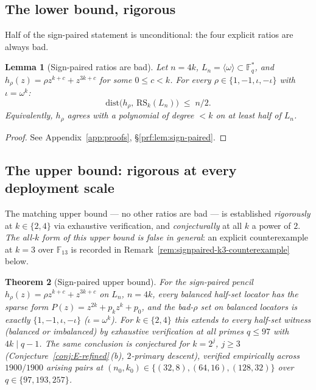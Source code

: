 \documentclass[11pt]{article}
\newtheorem{theorem}{Theorem}[section]
\newtheorem{lemma}[theorem]{Lemma}
\theoremstyle{definition}
\theoremstyle{remark}
\newcommand{\FF}{\mathbb{F}}
\newcommand{\RS}{\mathrm{RS}}
\newcommand{\dist}{\mathrm{dist}}
\begin{document}
\subsection{The lower bound, rigorous}

Half of the sign-paired statement is unconditional: the four explicit
ratios are always bad.

\begin{lemma}[Sign-paired ratios are bad]
\label{lem:sign-paired}
Let $n = 4k$, $L_n = \langle \omega \rangle \subset \FF_q^*$, and
$h_\rho(z) = \rho z^{k+c} + z^{3k+c}$ for some $0 \leq c < k$. For every
$\rho \in \{1, -1, \iota, -\iota\}$ with $\iota = \omega^k$:
\[
 \dist\bigl(h_\rho,\, \RS_k(L_n)\bigr) \;\leq\; n/2.
\]
Equivalently, $h_\rho$ agrees with a polynomial of degree $< k$ on at least
half of $L_n$.
\end{lemma}

\begin{proof}[Proof] See Appendix~\ref{app:proofs}, \S\ref{prf:lem:sign-paired}.\end{proof}

\subsection{The upper bound: rigorous at every deployment scale}
\label{ssec:signpaired-universal}

The matching upper bound --- no other ratios are bad --- is established
\emph{rigorously} at $k \in \{2, 4\}$ via exhaustive verification, and
\emph{conjecturally} at all $k$ a power of $2$. \emph{The all-$k$ form
of this upper bound is false in general}: an explicit counterexample at
$k = 3$ over $\mathbb{F}_{13}$ is recorded in
Remark~\ref{rem:signpaired-k3-counterexample} below.

\begin{theorem}[Sign-paired upper bound]
\label{thm:groebner-toy}
For the sign-paired pencil $h_\rho(z) = \rho z^{k+c} + z^{3k+c}$ on
$L_n$, $n = 4k$, every balanced half-set locator has the sparse form
$P(z) = z^{2k} + p_k z^k + p_0$, and the bad-$\rho$ set on balanced
locators is exactly $\{1, -1, \iota, -\iota\}$ ($\iota = \omega^k$).
For $k \in \{2, 4\}$ this extends to every half-set witness
(balanced or imbalanced) by exhaustive verification at all primes
$q \leq 97$ with $4k \mid q - 1$. The same conclusion is conjectured
for $k = 2^j$, $j \geq 3$ (Conjecture~\ref{conj:E-refined}\,(b),
$2$-primary descent), verified empirically across $1900/1900$
arising pairs at $(n_0, k_0) \in \{(32, 8), (64, 16), (128, 32)\}$
over $q \in \{97, 193, 257\}$.
\end{theorem}
\end{document}
